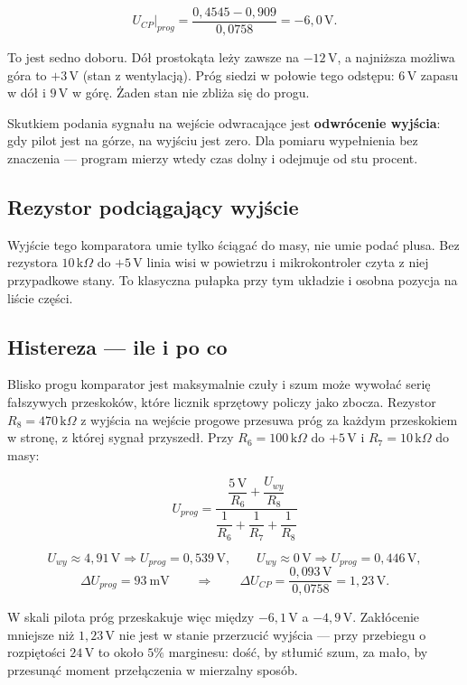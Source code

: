 \documentclass[a4paper,11pt]{article}
\newcommand{\kohm}{\,\mathrm{k}\Omega}
\newcommand{\volt}{\,\mathrm{V}}
\begin{document}
\[
U_{CP}\big|_{prog}=\frac{0{,}4545-0{,}909}{0{,}0758}=-6{,}0\volt .
\]

To jest sedno doboru. Dół prostokąta leży zawsze na $-12\volt$, a najniższa możliwa
góra to $+3\volt$ (stan z wentylacją). Próg siedzi w połowie tego odstępu: $6\volt$
zapasu w dół i $9\volt$ w górę. Żaden stan nie zbliża się do progu.

Skutkiem podania sygnału na wejście odwracające jest \textbf{odwrócenie wyjścia}:
gdy pilot jest na górze, na wyjściu jest zero. Dla pomiaru wypełnienia bez
znaczenia --- program mierzy wtedy czas dolny i odejmuje od stu procent.

\subsection{Rezystor podciągający wyjście}

Wyjście tego komparatora umie tylko ściągać do masy, nie umie podać plusa. Bez
rezystora $10\kohm$ do $+5\volt$ linia wisi w powietrzu i mikrokontroler czyta z niej
przypadkowe stany. To klasyczna pułapka przy tym układzie i osobna pozycja na
liście części.

\subsection{Histereza --- ile i po co}

Blisko progu komparator jest maksymalnie czuły i szum może wywołać serię fałszywych
przeskoków, które licznik sprzętowy policzy jako zbocza. Rezystor $R_8=470\kohm$
z wyjścia na wejście progowe przesuwa próg za każdym przeskokiem w stronę, z której
sygnał przyszedł. Przy $R_6=100\kohm$ do $+5\volt$ i $R_7=10\kohm$ do masy:

\begin{equation}
U_{prog}=\frac{\dfrac{5\volt}{R_6}+\dfrac{U_{wy}}{R_8}}
              {\dfrac{1}{R_6}+\dfrac{1}{R_7}+\dfrac{1}{R_8}}
\label{eq:histereza}
\end{equation}

\[
U_{wy}\approx 4{,}91\volt \Rightarrow U_{prog}=0{,}539\volt,
\qquad
U_{wy}\approx 0\volt \Rightarrow U_{prog}=0{,}446\volt,
\]
\[
\Delta U_{prog}=93\ \mathrm{mV}
\qquad\Longrightarrow\qquad
\Delta U_{CP}=\frac{0{,}093\volt}{0{,}0758}=1{,}23\volt .
\]

W skali pilota próg przeskakuje więc między $-6{,}1\volt$ a $-4{,}9\volt$.
Zakłócenie mniejsze niż $1{,}23\volt$ nie jest w stanie przerzucić wyjścia --- przy
przebiegu o rozpiętości $24\volt$ to około $5\%$ marginesu: dość, by stłumić szum,
za mało, by przesunąć moment przełączenia w mierzalny sposób.
\end{document}
